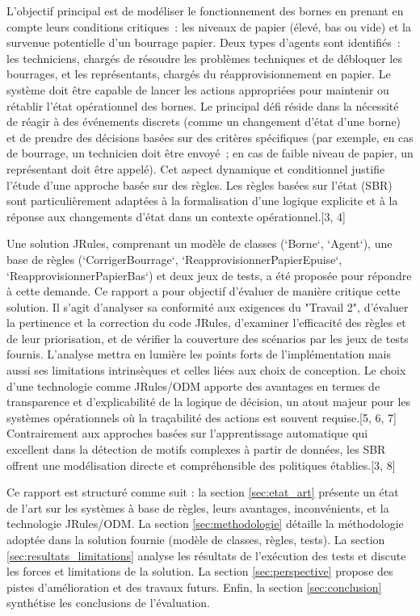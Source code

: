 \documentclass[11pt,a4paper]{article}
\begin{document}
L'objectif principal est de modéliser le fonctionnement des bornes en prenant en compte leurs conditions critiques : les niveaux de papier (élevé, bas ou vide) et la survenue potentielle d'un bourrage papier. Deux types d'agents sont identifiés : les techniciens, chargés de résoudre les problèmes techniques et de débloquer les bourrages, et les représentants, chargés du réapprovisionnement en papier. Le système doit être capable de lancer les actions appropriées pour maintenir ou rétablir l'état opérationnel des bornes. Le principal défi réside dans la nécessité de réagir à des événements discrets (comme un changement d'état d'une borne) et de prendre des décisions basées sur des critères spécifiques (par exemple, en cas de bourrage, un technicien doit être envoyé ; en cas de faible niveau de papier, un représentant doit être appelé). Cet aspect dynamique et conditionnel justifie l'étude d'une approche basée sur des règles. Les règles basées sur l'état (SBR) sont particulièrement adaptées à la formalisation d'une logique explicite et à la réponse aux changements d'état dans un contexte opérationnel.[3, 4]

Une solution JRules, comprenant un modèle de classes (`Borne`, `Agent`), une base de règles (`CorrigerBourrage`, `ReapprovisionnerPapierEpuise`, `ReapprovisionnerPapierBas`) et deux jeux de tests, a été proposée pour répondre à cette demande. Ce rapport a pour objectif d'évaluer de manière critique cette solution. Il s'agit d'analyser sa conformité aux exigences du "Travail 2", d'évaluer la pertinence et la correction du code JRules, d'examiner l'efficacité des règles et de leur priorisation, et de vérifier la couverture des scénarios par les jeux de tests fournis. L'analyse mettra en lumière les points forts de l'implémentation mais aussi ses limitations intrinsèques et celles liées aux choix de conception. Le choix d'une technologie comme JRules/ODM apporte des avantages en termes de transparence et d'explicabilité de la logique de décision, un atout majeur pour les systèmes opérationnels où la traçabilité des actions est souvent requise.[5, 6, 7] Contrairement aux approches basées sur l'apprentissage automatique qui excellent dans la détection de motifs complexes à partir de données, les SBR offrent une modélisation directe et compréhensible des politiques établies.[3, 8]

Ce rapport est structuré comme suit : la section \ref{sec:etat_art} présente un état de l'art sur les systèmes à base de règles, leurs avantages, inconvénients, et la technologie JRules/ODM. La section \ref{sec:methodologie} détaille la méthodologie adoptée dans la solution fournie (modèle de classes, règles, tests). La section \ref{sec:resultats_limitations} analyse les résultats de l'exécution des tests et discute les forces et limitations de la solution. La section \ref{sec:perspective} propose des pistes d'amélioration et des travaux futurs. Enfin, la section \ref{sec:conclusion} synthétise les conclusions de l'évaluation.
\end{document}
